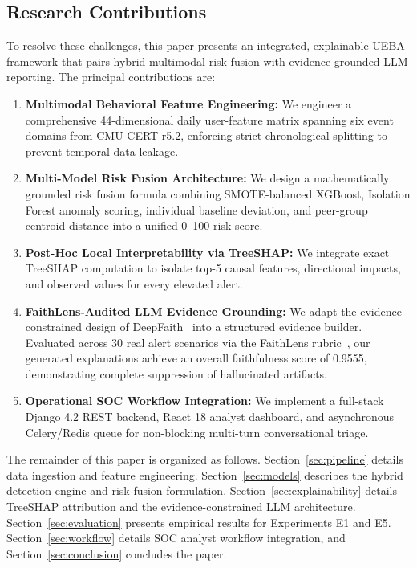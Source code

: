 \documentclass[conference]{IEEEtran}
\begin{document}
\subsection{Research Contributions}
To resolve these challenges, this paper presents an integrated, explainable UEBA framework that pairs hybrid multimodal risk fusion with evidence-grounded LLM reporting. The principal contributions are:
\begin{enumerate}
    \item \textbf{Multimodal Behavioral Feature Engineering:} We engineer a comprehensive 44-dimensional daily user-feature matrix spanning six event domains from CMU CERT r5.2, enforcing strict chronological splitting to prevent temporal data leakage.
    \item \textbf{Multi-Model Risk Fusion Architecture:} We design a mathematically grounded risk fusion formula combining SMOTE-balanced XGBoost, Isolation Forest anomaly scoring, individual baseline deviation, and peer-group centroid distance into a unified 0--100 risk score.
    \item \textbf{Post-Hoc Local Interpretability via TreeSHAP:} We integrate exact TreeSHAP computation to isolate top-5 causal features, directional impacts, and observed values for every elevated alert.
    \item \textbf{FaithLens-Audited LLM Evidence Grounding:} We adapt the evidence-constrained design of DeepFaith~\cite{phan2026deepfaith} into a structured evidence builder. Evaluated across 30 real alert scenarios via the FaithLens rubric~\cite{si2024faithlens}, our generated explanations achieve an overall faithfulness score of 0.9555, demonstrating complete suppression of hallucinated artifacts.
    \item \textbf{Operational SOC Workflow Integration:} We implement a full-stack Django 4.2 REST backend, React 18 analyst dashboard, and asynchronous Celery/Redis queue for non-blocking multi-turn conversational triage.
\end{enumerate}

The remainder of this paper is organized as follows. Section~\ref{sec:pipeline} details data ingestion and feature engineering. Section~\ref{sec:models} describes the hybrid detection engine and risk fusion formulation. Section~\ref{sec:explainability} details TreeSHAP attribution and the evidence-constrained LLM architecture. Section~\ref{sec:evaluation} presents empirical results for Experiments E1 and E5. Section~\ref{sec:workflow} details SOC analyst workflow integration, and Section~\ref{sec:conclusion} concludes the paper.
\end{document}
